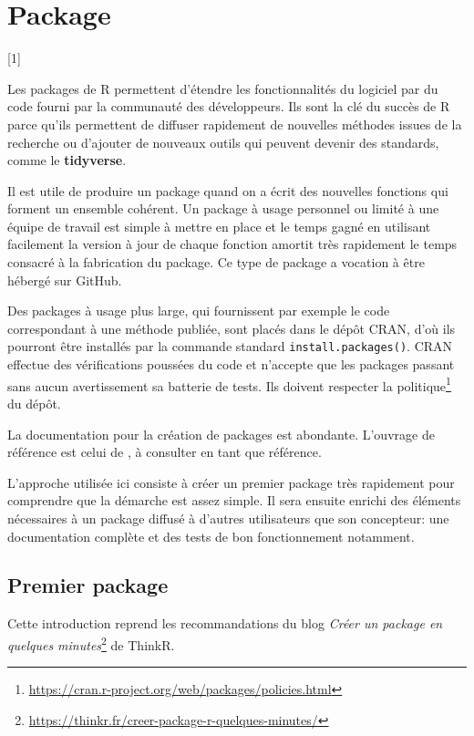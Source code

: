 \documentclass[
  12pt,
  french,
  a4paper,
  extrafontsizes,onecolumn,openright
  ]{memoir}
\newcommand{\toc}[1]{%
  \startcontents[chapters]%
  \printcontents[chapters]{}{1}[#1]{}%
  ~\newline%
}
\begin{document}
\chapter{Package}\label{chap-package}

\toc{1}

Les packages de R permettent d'étendre les fonctionnalités du logiciel par du code fourni par la communauté des développeurs.
Ils sont la clé du succès de R parce qu'ils permettent de diffuser rapidement de nouvelles méthodes issues de la recherche ou d'ajouter de nouveaux outils qui peuvent devenir des standards, comme le \textbf{tidyverse}.

Il est utile de produire un package quand on a écrit des nouvelles fonctions qui forment un ensemble cohérent.
Un package à usage personnel ou limité à une équipe de travail est simple à mettre en place et le temps gagné en utilisant facilement la version à jour de chaque fonction amortit très rapidement le temps consacré à la fabrication du package.
Ce type de package a vocation à être hébergé sur GitHub.

Des packages à usage plus large, qui fournissent par exemple le code correspondant à une méthode publiée, sont placés dans le dépôt CRAN, d'où ils pourront être installés par la commande standard \texttt{install.packages()}.
CRAN effectue des vérifications poussées du code et n'accepte que les packages passant sans aucun avertissement sa batterie de tests.
Ils doivent respecter la politique\footnote{\url{https://cran.r-project.org/web/packages/policies.html}} du dépôt.

La documentation pour la création de packages est abondante.
L'ouvrage de référence est celui de \textcite{Wickham2015}, à consulter en tant que référence.

L'approche utilisée ici consiste à créer un premier package très rapidement pour comprendre que la démarche est assez simple.
Il sera ensuite enrichi des éléments nécessaires à un package diffusé à d'autres utilisateurs que son concepteur: une documentation complète et des tests de bon fonctionnement notamment.

\section{Premier package}\label{premier-package}

Cette introduction reprend les recommandations du blog \emph{Créer un package en quelques minutes}\footnote{\url{https://thinkr.fr/creer-package-r-quelques-minutes/}} de ThinkR.
\end{document}
